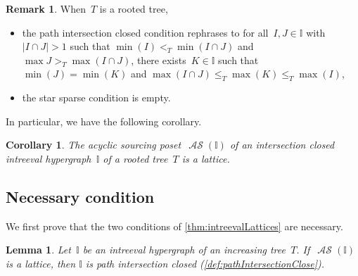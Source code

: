 \documentclass{amsart}
\newtheorem{corollary}[theorem]{Corollary}
\newtheorem{lemma}[theorem]{Lemma}
\theoremstyle{definition}
\newtheorem{remark}[theorem]{Remark}
\DeclareMathOperator{\ASour}{\mathcal{AS}}  %
\newcommand{\II}{\mathbb I} %
\begin{document}
\begin{remark}
When~$T$ is a rooted tree,
\begin{itemize}
\item the path intersection closed condition rephrases to for all~$I,J\in \II$ with~$|I\cap J|> 1$ such that $\min(I) <_T \min(I\cap J)$ and  $\max J >_T \max (I\cap J)$, there exists~$K \in \II$ such that $\min(J) = \min(K)$ and ${\max(I\cap J) \le_T \max(K) \le_T \max(I)}$,
\item the star sparse condition is empty.
\end{itemize}
In particular, we have the following corollary.
\end{remark}

\begin{corollary}
The acyclic sourcing poset~$\ASour(\II)$ of an intersection closed intreeval hypergraph~$\II$ of a rooted tree~$T$ is a lattice.
\end{corollary}


\subsection{Necessary condition}
\label{subsec:necessary}

We first prove that the two conditions of \cref{thm:intreevalLattices} are necessary.

\begin{lemma}
\label{lem:pathIntersectionClosed}
Let~$\II$ be an intreeval hypergraph of an increasing tree~$T$.
If~$\ASour(\II)$ is a lattice, then $\II$ is path intersection closed (\cref{def:pathIntersectionClose}).
\end{lemma}
\end{document}
